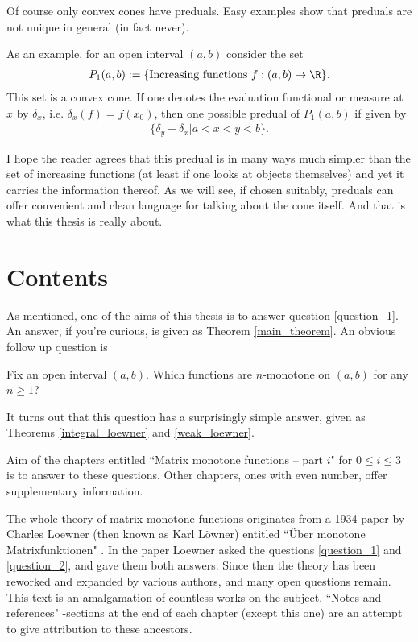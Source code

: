 Of course only convex cones have preduals. Easy examples show that preduals are not unique in general (in fact never).

As an example, for an open interval $(a, b)$ consider the set
\begin{align*}
	P_{1}(a, b) := \{\text{Increasing functions $f : (a, b) \to \R$}\}.
\end{align*}
This set is a convex cone. If one denotes the evaluation functional or measure at $x$ by $\delta_{x}$, i.e. $\delta_{x}(f) = f(x_{0})$, then one possible predual of $P_{1}(a, b)$ if given by
\begin{align*}
	\{\delta_{y} - \delta_{x} | a < x < y < b \}.
\end{align*}

I hope the reader agrees that this predual is in many ways much simpler than the set of increasing functions (at least if one looks at objects themselves) and yet it carries the information thereof. As we will see, if chosen suitably, preduals can offer convenient and clean language for talking about the cone itself. And that is what this thesis is really about.

\section{Contents}

As mentioned, one of the aims of this thesis is to answer question \ref{question_1}. An answer, if you're curious, is given as Theorem \ref{main_theorem}. An obvious follow up question is

\begin{quest}\label{question_2}
	Fix an open interval $(a, b)$. Which functions are $n$-monotone on $(a, b)$ for any $n \geq 1$?
\end{quest}

It turns out that this question has a surprisingly simple answer, given as Theorems \ref{integral_loewner} and \ref{weak_loewner}.

Aim of the chapters entitled ``Matrix monotone functions -- part $i$" for $0 \leq i \leq 3$ is to answer to these questions. Other chapters, ones with even number, offer supplementary information.

The whole theory of matrix monotone functions originates from a 1934 paper by Charles Loewner (then known as Karl Löwner) entitled ``Über monotone Matrixfunktionen" \cite{Low}. In the paper Loewner asked the questions \ref{question_1} and \ref{question_2}, and gave them both answers. Since then the theory has been reworked and expanded by various authors, and many open questions remain. This text is an amalgamation of countless works on the subject. ``Notes and references" -sections at the end of each chapter (except this one) are an attempt to give attribution to these ancestors.


